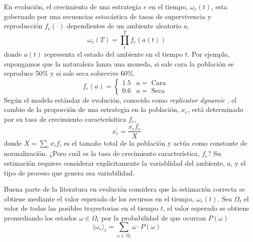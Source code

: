 \documentclass[a4paper,10pt]{article}
\begin{document}
En evolución, el crecimiento de una estrategia $e$ en el tiempo, $\omega_e(t)$, esta gobernado por una secuencias estocástica de tasas de supervivencia y reproducción $f_e(\cdot)$ dependientes de un ambiente aleatorio $a$,
%
\begin{equation} \label{eq:modelo_exponencial}
\omega_e(T) = \prod_t^T f_e(a(t))
\end{equation}
%
donde $a(t)$ representa el estado del ambiente en el tiempo $t$.
Por ejemplo, supongamos que la naturaleza lanza una moneda, si sale cara la población se reproduce 50\% y si sale seca sobrevive 60\%.
\begin{equation} \label{eq:estrategia_base}
f_e(a) =
\begin{cases}
 1.5 & a = \text{ Cara } \\
 0.6 & a = \text{ Seca }
\end{cases}
\end{equation}
Según el modelo estándar de evolución, conocido como \emph{replicator dynamic} \cite{taylor1978-replicatorDynamic, schuster1983-replicatorDynamics, hofbauer2003-evolutionaryGameDynamics}, el cambio de la proporción de una estrategia en la población, $x_e$, está determinado por su tasa de crecimiento caracterísitica $f_e$,
\begin{equation} \label{eq:replicator_dynamic}  \tag{Replicator dynamic}
x_e^\prime = \frac{x_e f_e}{X}
\end{equation}
donde $X=\sum_i x_i f_i$ es el tamaño total de la población y actúa como constante de normalización.
¿Pero cuál es la tasa de crecimiento característica, $f_e$?
Su estimación requiere considerar explícitamente la variablidad del ambiente, $a$, y el tipo de proceso que genera esa variabilidad.


Buena parte de la literatura en evolución considera que la estimación correcta se obtiene mediante el valor esperado de los recursos en el tiempo, $\omega_e(t)$.
Sea $\Omega_t$ el valor de todas las posibles trayectorias en el tiempo $t$, el valor esperado se obtiene promediando los estados $\omega \in \Omega_t$ por la probabilidad de que ocurran $P(\omega)$
\begin{equation}
\langle \omega_e \rangle_t = \sum_{\omega \in \Omega_t} \omega \cdot  P(\omega)
\end{equation}

\end{document}
